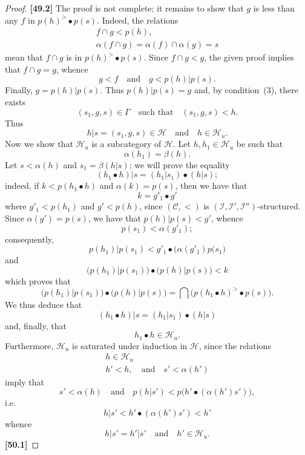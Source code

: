 \documentclass[a4paper,fleqn]{article}
\theoremstyle{plain}
\theoremstyle{definition}
\newenvironment{longcomm}[1]
  {\noindent\textbf{[#1]}\rmfamily}
  {}
\newcommand{\oldpage}[1]{{\marginpar{\footnotesize$\bigg\vert$\,\,\,\,\textit{p.~#1}}}}
\newcommand{\textand}{\quad\text{and}\quad}
\newcommand{\CC}{\mathcal{C}}
\newcommand{\HH}{\mathcal{H}}
\newcommand{\II}{\mathcal{I}}
\begin{document}
\begin{proof}
  \begin{longcomm}{49.2}
    The proof is not complete;
    it remains to show that $g$ is less than any $f$ in $p(h)^>\bullet p(s)$.
    Indeed, the relations
    \[
      \begin{gathered}
        f\cap g
        < p(h),
      \\\alpha(f\cap g)
        = \alpha(f)\cap\alpha(g)
        = s
      \end{gathered}
    \]
    mean that $f\cap g$ is in $p(h)^>\bullet p(s)$.
    Since $f\cap g<g$, the given proof implies that $f\cap g=g$, whence
    \[
      g<f
      \textand
      g < p(h)|p(s).
    \]
    Finally, $g=p(h)|p(s)$.
  \end{longcomm}
  Thus $p(h)|p(s)=g$ and, by condition~(3), there exists
  \[
    (s_1,g,s)\in\Gamma
    \quad\text{such that}\quad
    (s_1,g,s) < h.
  \]
  Thus
  \[
    h|s
    = (s_1,g,s)
    \in\HH
    \textand
    h\in\HH_u.
  \]
  Now we show that $\HH_u$ is a subcategory of $\HH$.
  Let $h,h_1\in\HH_u$ be such that
  \[
    \alpha(h_1)
    = \beta(h).
  \]
  Let $s<\alpha(h)$ and $s_1=\beta(h|s)$;
  we will prove the equality
  \[
    (h_1\bullet h)|s
    = (h_1|s_1)\bullet(h|s);
  \]
  indeed, if $k<p(h_1\bullet h)$ and $\alpha(k)=p(s)$, then we have that
  \[
    k = g'_1\bullet g'
  \]
  where $g'_1<p(h_1)$ and $g'<p(h)$, since $(\CC,<)$ is $(\II,\II',\II'')$-structured.
  \oldpage{378}
  Since $\alpha(g')=p(s)$, we have that $p(h)|p(s)<g'$, whence
  \[
    p(s_1)<\alpha(g'_1);
  \]
  consequently,
  \[
    p(h_1)|p(s_1)
    < g'_1\bullet\big(\alpha(g'_1)p(s_1\big)
  \]
  and
  \[\big(p(h_1)|p(s_1)\big)\bullet\big(p(h)|p(s)\big)
    < k
  \]
  which proves that
  \[
    \big(p(h_1)|p(s_1)\big)\bullet\big(p(h)|p(s)\big)
    = \bigcap \big(
      p(h_1\bullet h)^>\bullet p(s)
    \big).
  \]
  We thus deduce that
  \[
    (h_1\bullet h)|s
    = (h_1|s_1)\bullet(h|s)
  \]
  and, finally, that
  \[
    h_1\bullet h\in\HH_u.
  \]
  Furthermore, $\HH_u$ is saturated under induction in $\HH$, since the relations
  \[
    \begin{gathered}
      h\in\HH_u
    \\h'<h,
      \textand
      s'<\alpha(h')
    \end{gathered}
  \]
  imply that
  \[
    s'<\alpha(h)
    \textand
    p(h|s') < p\big(h'\bullet(\alpha(h')s')\big),
  \]
  i.e.
  \[
    h|s'
    < h'\bullet(\alpha(h')s')
    < h'
  \]
  whence
  \[
    h|s'
    = h'|s'
    \textand
    h'\in\HH_u.
  \]
  \begin{longcomm}{50.1}

\end{longcomm}
\end{proof}
\end{document}
